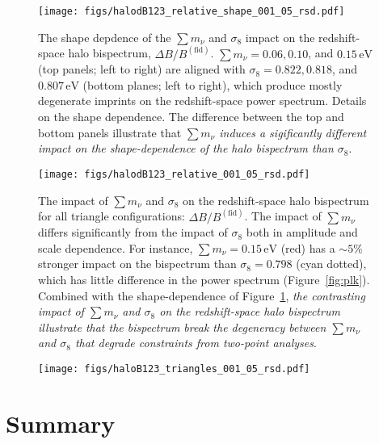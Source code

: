 \documentclass[12pt, letterpaper, preprint]{aastex62}
\newcommand{\smnu}{\sum m_\nu}
\newcommand{\sig}{\sigma_8}
\newcommand{\ch}[1]{{\color{orange}{\bf CH:} #1}}
\begin{document}
\begin{figure}
\begin{center}
\texttt{[image: figs/halodB123\_relative\_shape\_001\_05\_rsd.pdf]} 
    \caption{The shape depdence of the $\smnu$ and $\sig$ impact on the 
    redshift-space halo bispectrum, $\Delta B/B^\mathrm{(fid)}$. 
    $\smnu = 0.06, 0.10$, and $0.15\,\mathrm{eV}$ (top panels; left to right) are aligned
    with $\sig = 0.822, 0.818$, and $0.807\,\mathrm{eV}$ (bottom planes; left to right),
    which produce mostly degenerate imprints on the redshift-space power 
    spectrum. \ch{Details on the shape dependence}. 
    The difference between the top and bottom panels illustrate 
    that {\em $\smnu$ induces a sigificantly different impact on the 
    shape-dependence of the halo bispectrum than $\sig$}. 
    }
\label{fig:dbk_shape}
\end{center}
\end{figure}


\begin{figure}
\begin{center}
\texttt{[image: figs/halodB123\_relative\_001\_05\_rsd.pdf]}
    \caption{The impact of $\smnu$ and $\sig$ on the redshift-space 
    halo bispectrum for all triangle configurations: $\Delta B/B^\mathrm{(fid)}$. 
    The impact of $\smnu$ differs significantly from the impact of $\sig$ 
    both in amplitude and scale dependence. For instance, $\smnu = 0.15\,\mathrm{eV}$ 
    (red) has a $\sim 5\%$ stronger impact on the bispectrum than $\sig = 0.798$ 
    (cyan dotted), which has little difference in the power spectrum (Figure~\ref{fig:plk}). 
    Combined with the shape-dependence of Figure~\ref{fig:dbk_shape}, {\em the 
    contrasting impact of $\smnu$ and $\sig$ on the redshift-space halo bispectrum 
    illustrate that the bispectrum break the degeneracy between $\smnu$
    and $\sig$ that degrade constraints from two-point analyses}. 
    }
\label{fig:dbk_amp}
\end{center}
\end{figure}


\begin{figure}
\begin{center}
\texttt{[image: figs/haloB123\_triangles\_001\_05\_rsd.pdf]}
    \caption{}
\label{fig:dbk_amp}
\end{center}
\end{figure}



\section{Summary} 

%
\end{document}
